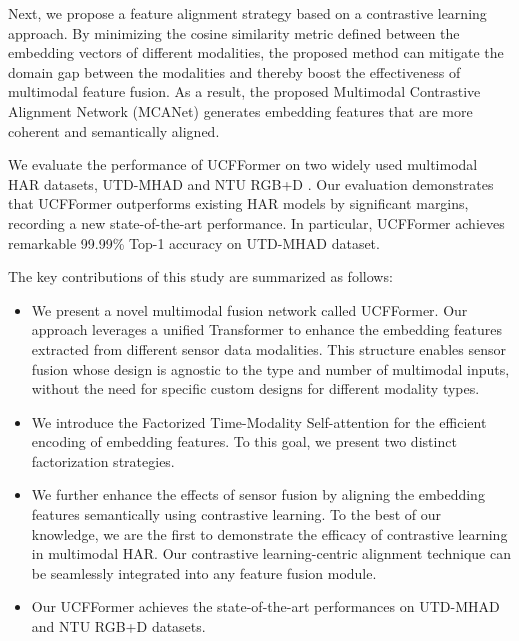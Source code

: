 Next, we propose a feature alignment strategy based on a contrastive learning approach. By minimizing the cosine similarity metric defined between the embedding vectors of different modalities, the proposed method can mitigate the domain gap between the modalities and thereby boost the effectiveness of multimodal feature fusion. As a result, the proposed Multimodal Contrastive Alignment Network (MCANet) generates embedding features that are more coherent and semantically aligned. 


We evaluate the performance of UCFFormer on two widely used multimodal HAR datasets, UTD-MHAD \cite{chen2015utd} and NTU RGB+D \cite{shahroudy2016ntu}. Our evaluation demonstrates that UCFFormer outperforms existing HAR models by significant margins, recording a new state-of-the-art performance. In particular, UCFFormer achieves remarkable 99.99\% Top-1 accuracy on UTD-MHAD dataset. 

The key contributions of this study are summarized as follows:
\begin{itemize}
    \item We present a novel multimodal fusion network called UCFFormer. Our approach leverages a unified Transformer to enhance the embedding features extracted from different sensor data modalities. 
    This structure enables sensor fusion whose design is agnostic to the type and number of multimodal inputs, without the need for specific custom designs for different modality types. 
    \item We introduce the Factorized Time-Modality Self-attention for the efficient encoding of embedding features. To this goal, we present two distinct factorization strategies. 
    \item We further enhance the effects of sensor fusion by aligning the embedding features semantically using contrastive learning. To the best of our knowledge, we are the first to demonstrate the efficacy of contrastive learning in multimodal HAR. Our contrastive learning-centric alignment technique can be seamlessly integrated into any feature fusion module.
    \item Our UCFFormer achieves the state-of-the-art performances on UTD-MHAD \cite{chen2015utd} and NTU RGB+D \cite{shahroudy2016ntu} datasets. 
\end{itemize}
